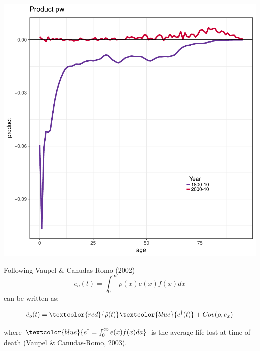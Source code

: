 \documentclass[xcolor={dvipsnames}]{beamer}
\begin{document}
\begin{frame}
\begin{center}
\includegraphics[scale=.5]{Figures/Sweden_product}
\end{center}
\end{frame}


\begin{frame}
\Large{Following Vaupel \& Canudas-Romo (2002)
\begin{equation}
\dot{e}_o(t) = \int_0^\infty \rho(x)e(x)f(x)dx
\end{equation}
can be written as:

\begin{equation}
\dot{e}_o(t) = \textcolor{red}{\bar{\rho}(t)}\textcolor{blue}{e^\dagger(t)} + Cov(\rho,e_x)
\end{equation}

where $\textcolor{blue}{e^\dagger=\int_0^\infty e(x)f(x)da}$ is the average life lost at time of death (Vaupel \& Canudas-Romo, 2003).

}
\end{frame}
\end{document}
